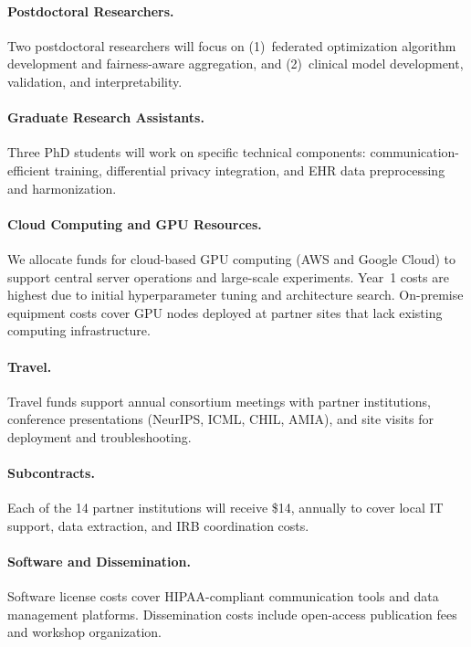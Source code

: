 \documentclass[12pt,letterpaper]{article}
\begin{document}
\paragraph{Postdoctoral Researchers.} Two postdoctoral researchers will focus on (1)~federated optimization algorithm development and fairness-aware aggregation, and (2)~clinical model development, validation, and interpretability.

\paragraph{Graduate Research Assistants.} Three PhD students will work on specific technical components: communication-efficient training, differential privacy integration, and EHR data preprocessing and harmonization.

\paragraph{Cloud Computing and GPU Resources.} We allocate funds for cloud-based GPU computing (AWS and Google Cloud) to support central server operations and large-scale experiments. Year~1 costs are highest due to initial hyperparameter tuning and architecture search. On-premise equipment costs cover GPU nodes deployed at partner sites that lack existing computing infrastructure.

\paragraph{Travel.} Travel funds support annual consortium meetings with partner institutions, conference presentations (NeurIPS, ICML, CHIL, AMIA), and site visits for deployment and troubleshooting.

\paragraph{Subcontracts.} Each of the 14 partner institutions will receive \$14, annually to cover local IT support, data extraction, and IRB coordination costs.

\paragraph{Software and Dissemination.} Software license costs cover HIPAA-compliant communication tools and data management platforms. Dissemination costs include open-access publication fees and workshop organization.
\end{document}
